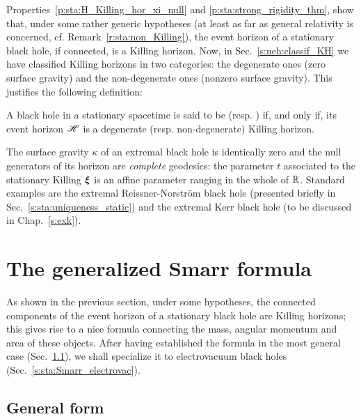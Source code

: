 Properties~\ref{p:sta:H_Killing_hor_xi_null} and \ref{p:sta:strong_rigidity_thm},
show that, under some rather generic hypotheses (at least as far as general
relativity is concerned, cf. Remark~\ref{r:sta:non_Killing}),
the event horizon of a stationary black hole, if connected,
is a Killing horizon. Now, in Sec.~\ref{s:neh:classif_KH}
we have classified Killing horizons in two
categories: the degenerate ones
(zero surface gravity) and the non-degenerate ones
(nonzero surface gravity). This justifies the
following definition:

\begin{greybox}
A black hole in a stationary spacetime is said to be  (resp. ) if, and
only if, its event horizon $\mathscr{H}$ is a degenerate (resp. non-degenerate) Killing horizon.
\end{greybox}

The surface gravity $\kappa$ of an extremal black hole is identically zero and
the null generators of its horizon are \emph{complete} geodesics: the parameter $t$
associated to the stationary Killing $\bm{\xi}$ is an affine parameter ranging
in the whole of $\mathbb{R}$.
Standard examples are the extremal Reissner-Norström black hole (presented
briefly in Sec.~\ref{s:sta:uniqueness_static}) and
the extremal Kerr black hole (to be discussed in Chap.~\ref{s:exk}).



\section{The generalized Smarr formula} \label{s:sta:Smarr}

As shown in the previous section, under some hypotheses, the connected components of the event horizon of a stationary black hole are Killing horizons; this gives rise to a nice formula connecting the
mass, angular momentum and area of these objects. After having established
the formula in the most general case (Sec.~\ref{s:sta:Smarr_general}),
we shall specialize it to electrovacuum black holes (Sec.~\ref{s:sta:Smarr_electrovac}).

\subsection{General form} \label{s:sta:Smarr_general}

